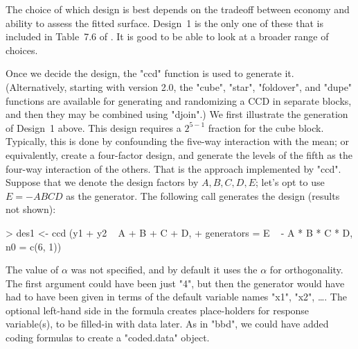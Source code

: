 \documentclass[article,nojss]{jss}
\begin{document}
The choice of which design is best depends on the tradeoff between economy and ability to assess the fitted surface.  Design~1 is the only one of these that is included in Table~7.6 of \cite{Mye09}.  It is good to be able to look at a broader range of choices.

Once we decide the design, the "ccd" function is used to generate it. (Alternatively, starting with  version 2.0, the "cube", "star", "foldover", and "dupe" functions are available for generating and randomizing a CCD in separate blocks, and then they may be combined using "djoin".)
We first illustrate the generation of Design~1 above.  This design requires a $2^{5-1}$ fraction for the cube block.  Typically, this is done by confounding the five-way interaction with the mean; or equivalently, create a four-factor design, and generate the levels of the fifth as the four-way interaction of the others.  That is the approach implemented by "ccd".
Suppose that we denote the design factors by $A,B,C,D,E$; let's opt to use $E=-ABCD$ as the generator.  The following call generates the design (results not shown):
\begin{Schunk}
\begin{Sinput}
> des1 <- ccd (y1 + y2 ~ A + B + C + D,
+   generators = E ~ - A * B * C * D, n0 = c(6, 1))
\end{Sinput}
\end{Schunk}
The value of $\alpha$ was not specified, and by default it uses the $\alpha$ for orthogonality.  The first argument could have been just "4", but then the generator would have had to have been given in terms of the default variable names "x1", "x2", \ldots.  The optional left-hand side in the formula creates place-holders for response variable(s), to be filled-in with data later.  As in "bbd", we could have added coding formulas to create a "coded.data" object. 
\end{document}
